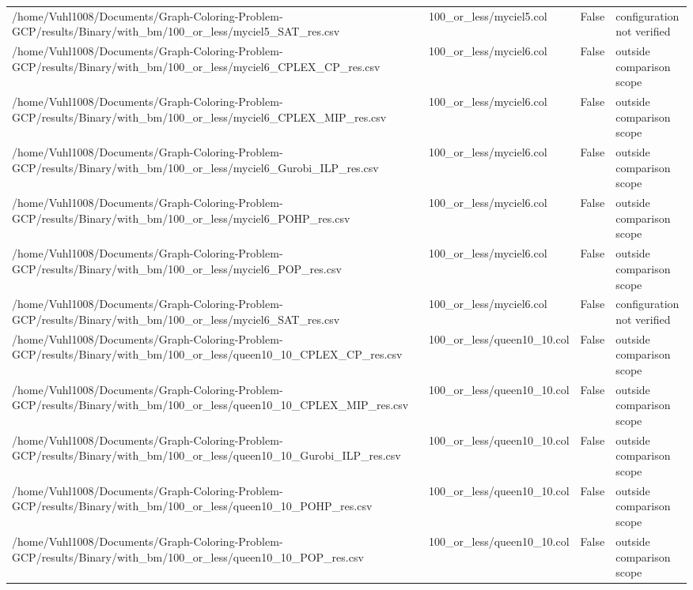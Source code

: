 \begin{table}[htbp]
\begin{tabular}{llll}
/home/Vuhl1008/Documents/Graph-Coloring-Problem-GCP/results/Binary/with\_bm/100\_or\_less/myciel5\_SAT\_res.csv & 100\_or\_less/myciel5.col & False & configuration not verified \\
/home/Vuhl1008/Documents/Graph-Coloring-Problem-GCP/results/Binary/with\_bm/100\_or\_less/myciel6\_CPLEX\_CP\_res.csv & 100\_or\_less/myciel6.col & False & outside comparison scope \\
/home/Vuhl1008/Documents/Graph-Coloring-Problem-GCP/results/Binary/with\_bm/100\_or\_less/myciel6\_CPLEX\_MIP\_res.csv & 100\_or\_less/myciel6.col & False & outside comparison scope \\
/home/Vuhl1008/Documents/Graph-Coloring-Problem-GCP/results/Binary/with\_bm/100\_or\_less/myciel6\_Gurobi\_ILP\_res.csv & 100\_or\_less/myciel6.col & False & outside comparison scope \\
/home/Vuhl1008/Documents/Graph-Coloring-Problem-GCP/results/Binary/with\_bm/100\_or\_less/myciel6\_POHP\_res.csv & 100\_or\_less/myciel6.col & False & outside comparison scope \\
/home/Vuhl1008/Documents/Graph-Coloring-Problem-GCP/results/Binary/with\_bm/100\_or\_less/myciel6\_POP\_res.csv & 100\_or\_less/myciel6.col & False & outside comparison scope \\
/home/Vuhl1008/Documents/Graph-Coloring-Problem-GCP/results/Binary/with\_bm/100\_or\_less/myciel6\_SAT\_res.csv & 100\_or\_less/myciel6.col & False & configuration not verified \\
/home/Vuhl1008/Documents/Graph-Coloring-Problem-GCP/results/Binary/with\_bm/100\_or\_less/queen10\_10\_CPLEX\_CP\_res.csv & 100\_or\_less/queen10\_10.col & False & outside comparison scope \\
/home/Vuhl1008/Documents/Graph-Coloring-Problem-GCP/results/Binary/with\_bm/100\_or\_less/queen10\_10\_CPLEX\_MIP\_res.csv & 100\_or\_less/queen10\_10.col & False & outside comparison scope \\
/home/Vuhl1008/Documents/Graph-Coloring-Problem-GCP/results/Binary/with\_bm/100\_or\_less/queen10\_10\_Gurobi\_ILP\_res.csv & 100\_or\_less/queen10\_10.col & False & outside comparison scope \\
/home/Vuhl1008/Documents/Graph-Coloring-Problem-GCP/results/Binary/with\_bm/100\_or\_less/queen10\_10\_POHP\_res.csv & 100\_or\_less/queen10\_10.col & False & outside comparison scope \\
/home/Vuhl1008/Documents/Graph-Coloring-Problem-GCP/results/Binary/with\_bm/100\_or\_less/queen10\_10\_POP\_res.csv & 100\_or\_less/queen10\_10.col & False & outside comparison scope \\

\end{tabular}
\end{table}
